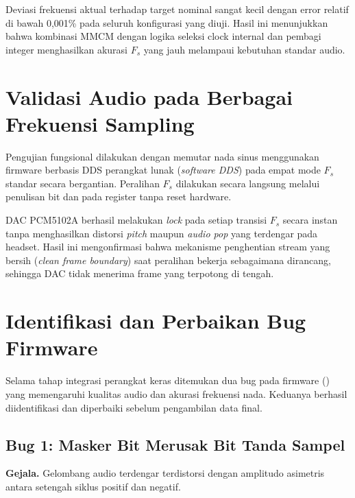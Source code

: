 Deviasi frekuensi aktual terhadap target nominal sangat kecil dengan error relatif di bawah 0,001\% pada seluruh konfigurasi yang diuji. Hasil ini menunjukkan bahwa kombinasi MMCM dengan logika seleksi clock internal dan pembagi integer menghasilkan akurasi $F_s$ yang jauh melampaui kebutuhan standar audio.

\section{Validasi Audio pada Berbagai Frekuensi Sampling}

Pengujian fungsional dilakukan dengan memutar nada sinus menggunakan firmware berbasis DDS perangkat lunak (\textit{software DDS}) pada empat mode $F_s$ standar secara bergantian. Peralihan $F_s$ dilakukan secara langsung melalui penulisan bit  dan  pada register  tanpa reset hardware.

DAC PCM5102A berhasil melakukan \textit{lock} pada setiap transisi $F_s$ secara instan tanpa menghasilkan distorsi \textit{pitch} maupun \textit{audio pop} yang terdengar pada headset. Hasil ini mengonfirmasi bahwa mekanisme penghentian stream yang bersih (\textit{clean frame boundary}) saat peralihan  bekerja sebagaimana dirancang, sehingga DAC tidak menerima frame yang terpotong di tengah.

\section{Identifikasi dan Perbaikan Bug Firmware}

Selama tahap integrasi perangkat keras ditemukan dua bug pada firmware () yang memengaruhi kualitas audio dan akurasi frekuensi nada. Keduanya berhasil diidentifikasi dan diperbaiki sebelum pengambilan data final.

\subsection{Bug 1: Masker Bit Merusak Bit Tanda Sampel}

\textbf{Gejala.} Gelombang audio terdengar terdistorsi dengan amplitudo asimetris antara setengah siklus positif dan negatif.

